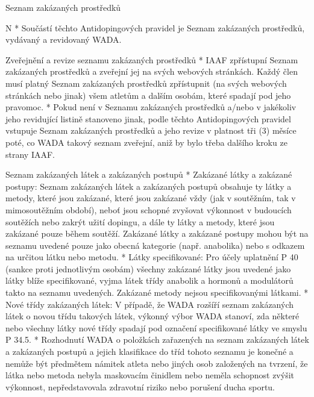 \secc Seznam zakázaných prostředků

\begitems \style N
* Součástí těchto Antidopingových pravidel je Seznam zakázaných prostředků, vydávaný a revidovaný WADA.

Zveřejnění a revize seznamu zakázaných prostředků
* IAAF zpřístupní Seznam zakázaných prostředků a zveřejní jej na svých webových stránkách. Každý člen musí platný Seznam zakázaných prostředků zpřístupnit (na svých webových stránkách nebo jinak) všem atletům a dalším osobám, které spadají pod jeho pravomoc.
* Pokud není v Seznamu zakázaných prostředků a/nebo v jakékoliv jeho revidující listině stanoveno jinak, podle těchto Antidopingových pravidel vstupuje Seznam zakázaných prostředků a jeho revize v platnost tři (3) měsíce poté, co WADA takový seznam zveřejní, aniž by bylo třeba dalšího kroku ze strany IAAF.

Seznam zakázaných látek a zakázaných postupů
* Zakázané látky a zakázané postupy: Seznam zakázaných látek a zakázaných postupů obsahuje ty látky a metody, které jsou zakázané, které jsou zakázané vždy (jak v soutěžním, tak v mimosoutěžním období), neboť jsou schopné zvyšovat výkonnost v budoucích soutěžích nebo zakrýt užití dopingu, a dále ty látky a metody, které jsou zakázané pouze během soutěží. Zakázané látky a zakázané postupy mohou být na seznamu uvedené pouze jako obecná kategorie (např. anabolika) nebo s odkazem na určitou látku nebo metodu.
* Látky specifikované: Pro účely uplatnění P 40 (sankce proti jednotlivým osobám) všechny zakázané látky jsou uvedené jako látky blíže specifikované, vyjma látek třídy anabolik a hormonů a modulátorů takto na seznamu uvedených. Zakázané metody nejsou specifikovanými látkami.
* Nové třídy zakázaných látek: V případě, že WADA rozšíří seznam zakázaných látek o novou třídu takových látek, výkonný výbor WADA stanoví, zda některé nebo všechny látky nové třídy spadají pod označení specifikované látky ve smyslu P 34.5.
* Rozhodnutí WADA o položkách zařazených na seznam zakázaných látek a zakázaných postupů a jejich klasifikace do tříd tohoto seznamu je konečné a nemůže být předmětem námitek atleta nebo jiných osob založených na tvrzení, že látka nebo metoda nebyla maskovacím činidlem nebo neměla schopnost zvýšit výkonnost, nepředstavovala zdravotní riziko nebo porušení ducha sportu.

